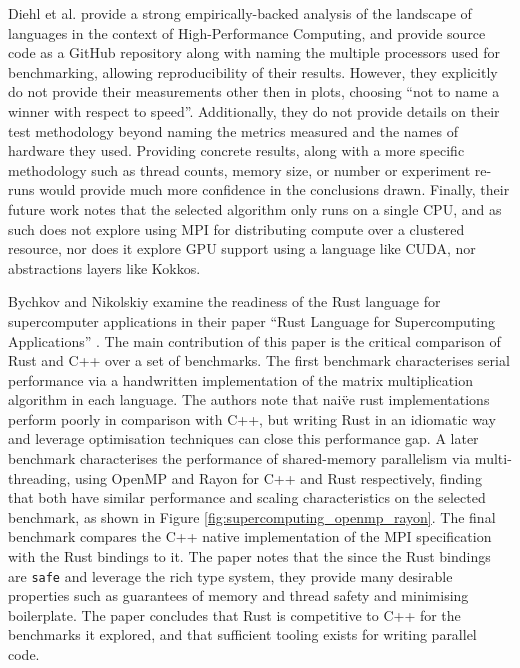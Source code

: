 Diehl et al. provide a strong empirically-backed analysis of the landscape of languages in the context of High-Performance Computing, and provide source code as a GitHub repository \cite{} along with naming the multiple processors used for benchmarking, allowing reproducibility of their results. However, they explicitly do not provide their measurements other then in plots, choosing ``not to name a winner with respect to speed''. Additionally, they do not provide details on their test methodology beyond naming the metrics measured and the names of hardware they used. Providing concrete results, along with a more specific methodology such as thread counts, memory size, or number or experiment re-runs would provide much more confidence in the conclusions drawn. %
Finally, their future work notes that the selected algorithm only runs on a single CPU, and as such does not explore using MPI for distributing compute over a clustered resource, nor does it explore GPU support using a language like CUDA, nor abstractions layers like Kokkos.

Bychkov and Nikolskiy examine the readiness of the Rust language for supercomputer applications in their paper ``Rust Language for Supercomputing Applications'' \cite{bychkovRustLanguageSupercomputing2021}. The main contribution of this paper is the critical comparison of Rust and C++ over a set of benchmarks. The first benchmark characterises serial performance via a handwritten implementation of the matrix multiplication algorithm in each language. The authors note that nai\"ve rust implementations perform poorly in comparison with C++, but writing Rust in an idiomatic way and leverage optimisation techniques can close this performance gap. A later benchmark characterises the performance of shared-memory parallelism via multi-threading, using OpenMP and Rayon for C++ and Rust respectively, finding that both have similar performance and scaling characteristics on the selected benchmark, as shown in Figure \ref{fig:supercomputing_openmp_rayon}. The final benchmark compares the C++ native implementation of the MPI specification with the Rust bindings to it. The paper notes that the since the Rust bindings are \texttt{safe} and leverage the rich type system, they provide many desirable properties such as guarantees of memory and thread safety and minimising boilerplate. The paper concludes that Rust is competitive to C++ for the benchmarks it explored, and that sufficient tooling exists for writing parallel code.


